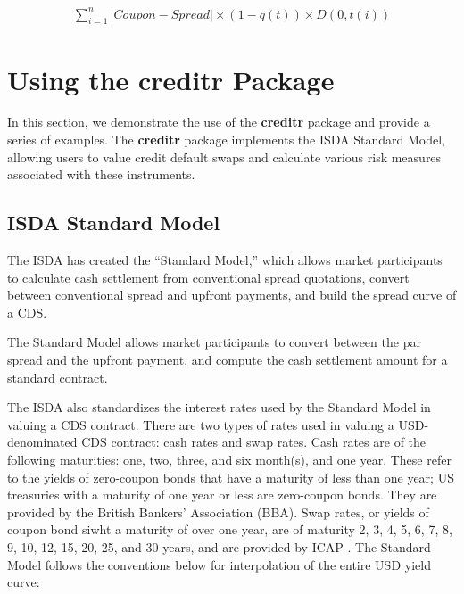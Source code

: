 \documentclass{jss}
\begin{document}
\begin{equation}
 \begin{aligned}
   \displaystyle\sum_{i=1}^{n}|Coupon - Spread| \times (1-q(t)) \times D(0, t(i))
    \end{aligned}
\end{equation}

\section{Using the creditr Package}

In this section, we demonstrate the use of the \textbf{creditr} package and provide a series of examples. The \textbf{creditr} package implements the ISDA Standard Model, allowing users to value credit default swaps and calculate various risk measures associated with these instruments. 

\subsection{ISDA Standard Model}

The ISDA has created the ``Standard Model,'' which allows market participants to calculate cash settlement from conventional spread quotations, convert between conventional spread and upfront payments, and build the spread curve of a CDS. 

The Standard Model allows market participants to convert between the par spread and the upfront payment, and compute the cash settlement amount for a standard contract.

The ISDA also standardizes the interest rates used by the Standard Model in valuing a CDS contract. There are two types of rates used in valuing a USD-denominated CDS contract: cash rates and swap rates. Cash rates are of the following maturities: one, two, three, and six month(s), and one year. These refer to the yields of zero-coupon bonds that have a maturity of less than one year; US treasuries with a maturity of one year or less are zero-coupon bonds. They are provided by the British Bankers' Association (BBA). Swap rates, or yields of coupon bond siwht a maturity of over one year, are of maturity 2, 3, 4, 5, 6, 7, 8, 9, 10, 12, 15, 20, 25, and 30 years, and are provided by ICAP \citep{rates}. The Standard Model follows the conventions below for interpolation of the entire USD yield curve:
\end{document}

